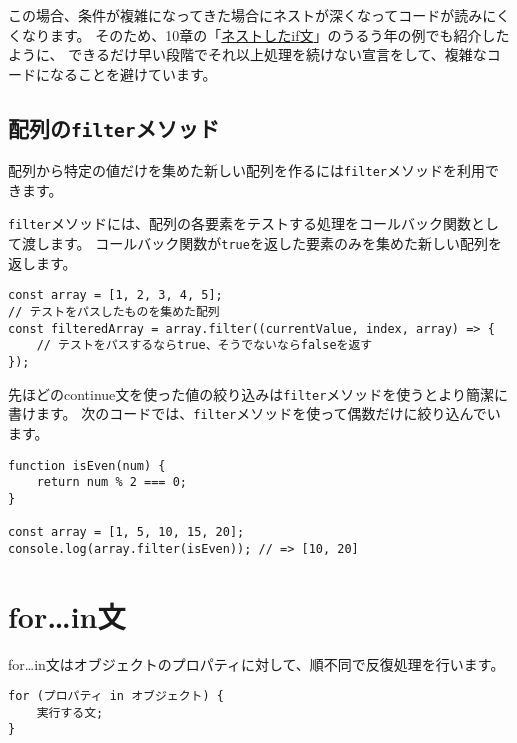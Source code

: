 この場合、条件が複雑になってきた場合にネストが深くなってコードが読みにくくなります。
そのため、10章の「\hyperlink{nested-if-statement}{ネストしたif文}」のうるう年の例でも紹介したように、
できるだけ早い段階でそれ以上処理を続けない宣言をして、複雑なコードになることを避けています。

\hypertarget{array-filter}{%
\subsection{\texorpdfstring{配列の\texttt{filter}メソッド}{配列のfilterメソッド}}\label{array-filter}}

配列から特定の値だけを集めた新しい配列を作るには\texttt{filter}メソッドを利用できます。

\texttt{filter}メソッドには、配列の各要素をテストする処理をコールバック関数として渡します。
コールバック関数が\texttt{true}を返した要素のみを集めた新しい配列を返します。

\begin{lstlisting}
const array = [1, 2, 3, 4, 5];
// テストをパスしたものを集めた配列
const filteredArray = array.filter((currentValue, index, array) => {
    // テストをパスするならtrue、そうでないならfalseを返す
});
\end{lstlisting}

先ほどのcontinue文を使った値の絞り込みは\texttt{filter}メソッドを使うとより簡潔に書けます。
次のコードでは、\texttt{filter}メソッドを使って偶数だけに絞り込んでいます。

\begin{lstlisting}
function isEven(num) {
    return num % 2 === 0;
}

const array = [1, 5, 10, 15, 20];
console.log(array.filter(isEven)); // => [10, 20]
\end{lstlisting}

\hypertarget{for-in-statement}{%
\section{for\ldots{}in文}\label{for-in-statement}}

for\ldots{}in文はオブジェクトのプロパティに対して、順不同で反復処理を行います。

\begin{lstlisting}
for (プロパティ in オブジェクト) {
    実行する文;
}
\end{lstlisting}

